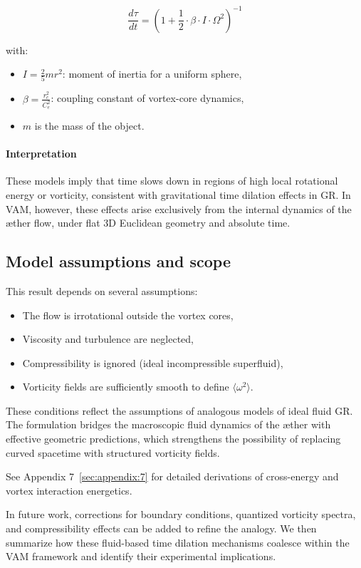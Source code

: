 \begin{equation}
    \frac{d\tau}{dt} =
    \left(1 + \frac{1}{2} \cdot \beta \cdot I \cdot \Omega^2 \right)^{-1}
\end{equation}

with:
\begin{itemize}
    \item \( I = \frac{2}{5} m r^2 \): moment of inertia for a uniform sphere,
    \item \( \beta = \frac{r_c^2}{C_e^2} \): coupling constant of vortex-core dynamics,
    \item \( m \) is the mass of the object. \end{itemize}

\paragraph{Interpretation}

These models imply that time slows down in regions of high local rotational energy or vorticity, consistent with gravitational time dilation effects in GR. In VAM, however, these effects arise exclusively from the internal dynamics of the æther flow, under flat 3D Euclidean geometry and absolute time.

\subsection{Model assumptions and scope}

This result depends on several assumptions:
\begin{itemize}
    \item The flow is irrotational outside the vortex cores,
    \item Viscosity and turbulence are neglected,
    \item Compressibility is ignored (ideal incompressible superfluid),
    \item Vorticity fields are sufficiently smooth to define $\langle \omega^2 \rangle$.
\end{itemize}

These conditions reflect the assumptions of analogous models of ideal fluid GR. The formulation bridges the macroscopic fluid dynamics of the æther with effective geometric predictions, which strengthens the possibility of replacing curved spacetime with structured vorticity fields.

See Appendix 7~\ref{sec:appendix:7} for detailed derivations of cross-energy and vortex interaction energetics.

In future work, corrections for boundary conditions, quantized vorticity spectra, and compressibility effects can be added to refine the analogy. We then summarize how these fluid-based time dilation mechanisms coalesce within the VAM framework and identify their experimental implications.
